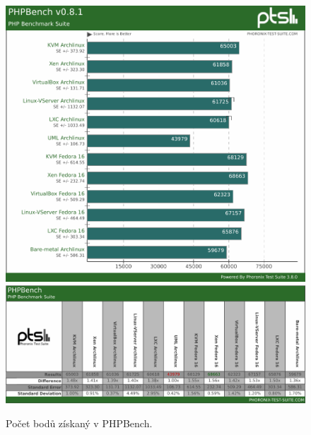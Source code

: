 \begin{figure}[h!]
  \centering
  \includegraphics[width=15cm]{obr/bench/phpbench-graph}
  \includegraphics[width=15cm]{obr/bench/phpbench-table}
  \caption{Počet bodů získaný v PHPBench.}
  \label{obr:bench:phpbench}
\end{figure}



